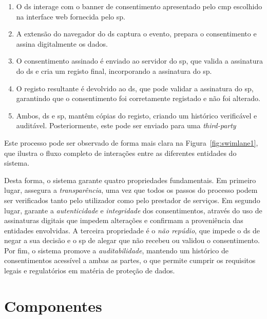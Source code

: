 \begin{enumerate}
    \item O \acrshort{ds} interage com o banner de consentimento apresentado pelo \acrshort{cmp} escolhido na interface web fornecida pelo \acrshort{sp}.
    \item A extensão do navegador do \acrshort{ds} captura o evento, prepara o consentimento e assina digitalmente os dados.
    \item O consentimento assinado é enviado ao servidor do \acrshort{sp}, que valida a assinatura do \acrshort{ds} e cria um registo final, incorporando a assinatura do \acrshort{sp}.
    \item O registo resultante é devolvido ao \acrshort{ds}, que pode validar a assinatura do \acrshort{sp}, garantindo que o consentimento foi corretamente registado e não foi alterado.
    \item Ambos, \acrshort{ds} e \acrshort{sp}, mantêm cópias do registo, criando um histórico verificável e auditável. Posteriormente, este pode ser enviado para uma \textit{third-party}
\end{enumerate}

Este processo pode ser observado de forma mais clara na Figura~\ref{fig:swimlane1}, que ilustra o fluxo completo de interações entre as diferentes entidades do sistema.

Desta forma, o sistema garante quatro propriedades fundamentais. Em primeiro lugar, assegura a \textit{transparência}, uma vez que todos os passos do processo podem ser verificados tanto pelo utilizador como pelo prestador de serviços. Em segundo lugar, garante a \textit{autenticidade} e \textit{integridade} dos consentimentos, através do uso de assinaturas digitais que impedem alterações e confirmam a proveniência das entidades envolvidas. A terceira propriedade é o \textit{não repúdio}, que impede o \acrshort{ds} de negar a sua decisão e o \acrshort{sp} de alegar que não recebeu ou validou o consentimento. Por fim, o sistema promove a \textit{auditabilidade}, mantendo um histórico de consentimentos acessível a ambas as partes, o que permite cumprir os requisitos legais e regulatórios em matéria de proteção de dados.

\section{Componentes}

